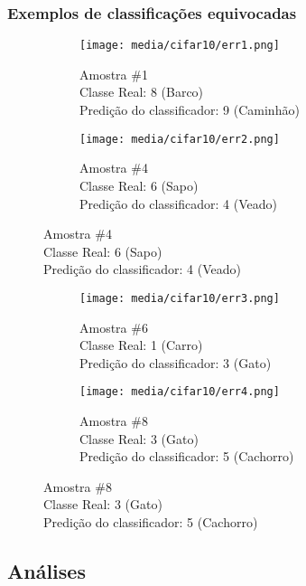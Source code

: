 \documentclass[a4paper]{article}
\begin{document}
\subsubsection{Exemplos de classificações equivocadas}

\begin{figure}[H]
    \centering
    \begin{subfigure}{.5\textwidth}
        \centerline{\texttt{[image: media/cifar10/err1.png]}}
        \caption{Amostra \#1  \\ Classe Real: 8 (Barco) \\ Predição do classificador: 9 (Caminhão)}
        \label{fig:fig20}
    \end{subfigure}%
    \begin{subfigure}{.5\textwidth}
        \centerline{\texttt{[image: media/cifar10/err2.png]}}
        \caption{Amostra \#4  \\ Classe Real: 6 (Sapo) \\ Predição do classificador: 4 (Veado)}
        \label{fig:fig21}
    \end{subfigure}%
\end{figure}
\begin{figure}[H]
    \centering
    \begin{subfigure}{.5\textwidth}
        \centerline{\texttt{[image: media/cifar10/err3.png]}}
        \caption{Amostra \#6  \\ Classe Real: 1 (Carro) \\ Predição do classificador: 3 (Gato)}
        \label{fig:fig22}
    \end{subfigure}%
    \begin{subfigure}{.5\textwidth}
        \centerline{\texttt{[image: media/cifar10/err4.png]}}
        \caption{Amostra \#8  \\ Classe Real: 3 (Gato) \\ Predição do classificador: 5 (Cachorro)}
        \label{fig:fig23}
    \end{subfigure}%
\end{figure}



\subsection{Análises}
\end{document}
